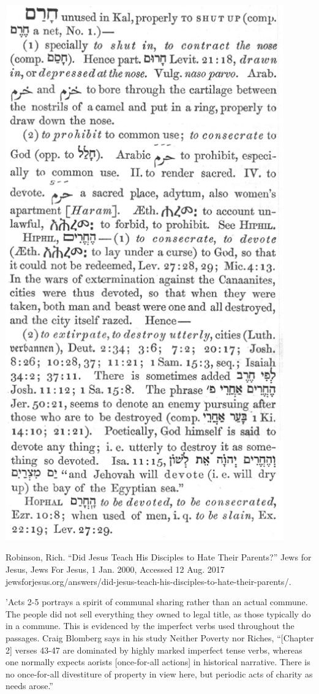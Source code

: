 \documentclass[11pt]{article}
\begin{document}
\begin{thebibliography}{37}
\includegraphics[width=12cm]{H2763}

Robinson, Rich. “Did Jesus Teach His Disciples to Hate Their Parents?” Jews for Jesus, Jews For Jesus, 1 Jan. 2000, Accessed 12 Aug. 2017 jewsforjesus.org/answers/did-jesus-teach-his-disciples-to-hate-their-parents/.

'Acts 2-5 portrays a spirit of communal sharing rather than an actual commune. The people did not sell everything they owned to legal title, as those typically do in a commune. This is evidenced by the imperfect verbs used throughout the passages. Craig Blomberg says in his study Neither Poverty nor Riches, “[Chapter 2] verses 43-47 are dominated by highly marked imperfect tense verbs, whereas one normally expects aorists [once-for-all actions] in historical narrative. There is no once-for-all divestiture of property in view here, but periodic acts of charity as needs arose.”


\end{thebibliography}
\end{document}
